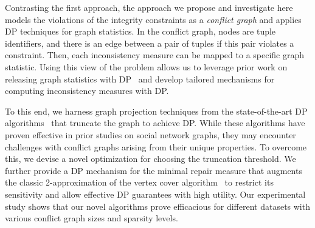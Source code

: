 Contrasting the first approach, the approach we propose and investigate here models the violations of the integrity constraints as a \emph{conflict graph} and applies DP techniques for graph statistics. In the conflict graph, nodes are tuple identifiers, and there is an edge between a pair of tuples if this pair violates a constraint. 
Then, each inconsistency measure can be mapped to a specific graph statistic. 
Using this view of the problem allows us to leverage prior work on releasing graph statistics with DP~\cite{hay2009accurate,KasiviswanathanNRS13,day2016publishing} and develop tailored mechanisms for computing inconsistency measures with DP. 

To this end, we harness graph projection techniques from the state-of-the-art DP algorithms~\cite{day2016publishing} that truncate the graph to achieve DP. While these algorithms have proven effective in prior studies on social network graphs, they may encounter challenges with conflict graphs arising from their unique properties. To overcome this, we devise a novel optimization for choosing the truncation threshold. 
We further provide a DP mechanism for the minimal repair measure that augments the classic 2-approximation of the vertex cover algorithm~\cite{vazirani1997approximation} to restrict its sensitivity and allow effective DP guarantees with high utility. 
Our experimental study shows that our novel algorithms prove efficacious for different datasets with various conflict graph sizes and sparsity levels. 









